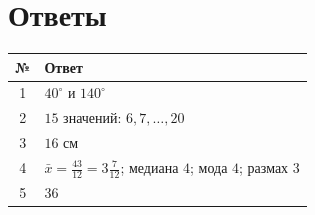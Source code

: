\documentclass[a4paper,12pt]{article}
\begin{document}
\clearpage
\section*{\color{darkaccent}Ответы}
\begin{tabularx}{\linewidth}{@{}cX@{}}
\toprule
№ & Ответ\\
\midrule
1 & $40^\circ$ и $140^\circ$\\
2 & $15$ значений: $6,7,\ldots,20$\\
3 & $16$ см\\
4 & $\bar x=\frac{43}{12}=3\frac{7}{12}$; медиана $4$; мода $4$; размах $3$\\
5 & $36$\\
\bottomrule
\end{tabularx}
\end{document}
